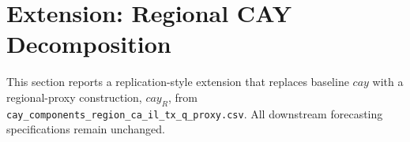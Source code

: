 \section{Extension: Regional CAY Decomposition}
\label{sec:extension}

This section reports a replication-style extension that replaces baseline
$cay$ with a regional-proxy construction, $cay_R$, from
\texttt{cay\_components\_region\_ca\_il\_tx\_q\_proxy.csv}. All downstream
forecasting specifications remain unchanged.

